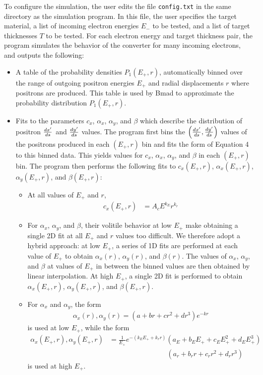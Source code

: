 \documentclass[12pt]{article}
\begin{document}
To configure the simulation, the user edits the file \texttt{config.txt} in the same directory as the simulation program.
In this file, the user specifies the target material, a list of incoming electron energies $E_-$ to be tested, and a list of target thicknesses $T$ to be tested.
For each electron energy and target thickness pair, the program simulates the behavior of the converter for many incoming electrons, and outputs the following:
\begin{itemize}
\item
A table of the probability densities $P_1(E_+, r)$, automatically binned over the range of outgoing positron energies $E_+$ and radial displacements $r$ where positrons are produced.
This table is used by Bmad to approximate the probability distribution $P_1(E_+, r)$.

\item
Fits to the parameters $c_x$, $\alpha_x$, $\alpha_y$, and $\beta$ which describe the distribution of positron $\frac{dx'}{ds}$ and $\frac{dy'}{ds}$ values.
The program first bins the $\left( \frac{dx'}{ds}, \frac{dy'}{ds} \right)$ values of the positrons produced in each $(E_+, r)$ bin and fits the form of Equation 4 to this binned data.
This yields values for $c_x$, $\alpha_x$, $\alpha_y$, and $\beta$ in each $(E_+, r)$ bin.
The program then performs the following fits to $c_x(E_+, r)$, $\alpha_x(E_+, r)$, $\alpha_y(E_+, r)$, and $\beta(E_+, r)$:
\begin{itemize}
\item
At all values of $E_+$ and $r$,
\begin{align}
c_x(E_+, r) & = A_c E^{k_E} r^{k_r}
\end{align}

\item
For $\alpha_x$, $\alpha_y$, and $\beta$, their volitile behavior at low $E_+$ make obtaining a single 2D fit at all $E_+$ and $r$ values too difficult.
We therefore adopt a hybrid approach:
at low $E_+$, a series of 1D fits are performed at each value of $E_+$ to obtain $\alpha_x(r)$, $\alpha_y(r)$, and $\beta(r)$.
The values of $\alpha_x$, $\alpha_y$, and $\beta$ at values of $E_+$ in between the binned values are then obtained by linear interpolation.
At high $E_+$, a single 2D fit is performed to obtain $\alpha_x(E_+, r)$, $\alpha_y(E_+, r)$, and $\beta(E_+, r)$.

\item
For $\alpha_x$ and $\alpha_y$, the form
\begin{align}
\alpha_x(r), \alpha_y(r) = (a + br + cr^2 + dr^3) e^{-kr}
\end{align}
is used at low $E_+$, while the form
\begin{align}
\alpha_x(E_+, r), \alpha_y(E_+, r) & =
\frac{1}{E_+} e^{-(k_E E_+ + k_r r)}
(a_E + b_E E_+ + c_E E_+^2 + d_E E_+^3) \\
& \,\,\,\,\,\,\,\,\,\,\,\,\,\,\,\,\,\,\,\,\,\,\,\,\,\,\,\,\,\,\,\,\,\,\,\,\,\,\,\,\,\,\,\,\,\,\,\,\,\, (a_r + b_r r + c_r r^2 + d_r r^3)
\end{align}
is used at high $E_+$.


\end{itemize}
\end{itemize}
\end{document}
